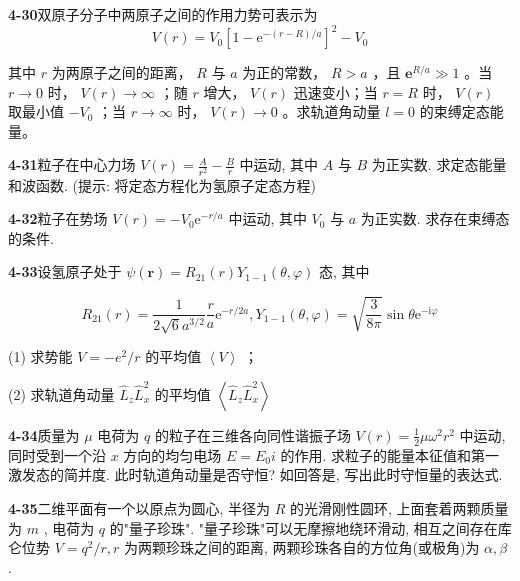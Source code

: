 \vfill

\newpage
\vfill

\noindent
\textbf{4-30}\quad 双原子分子中两原子之间的作用力势可表示为
$$
V (r) = V _ {0} \left[ 1 - \mathrm{e} ^ {- (r - R) / a} \right] ^ {2} - V _ {0}
$$

其中 $r$ 为两原子之间的距离， $R$ 与 $a$ 为正的常数， $R > a$ ，且 $\mathbf{e}^{R / a} \gg 1$ 。当 $r \to 0$ 时， $V(r) \to \infty$ ；随 $r$ 增大， $V(r)$ 迅速变小；当 $r = R$ 时， $V(r)$ 取最小值 $-V_0$ ；当 $r \to \infty$ 时， $V(r) \to 0$ 。求轨道角动量 $l = 0$ 的束缚定态能量。

\vfill

\newpage
\vfill

\noindent
\textbf{4-31}\quad 粒子在中心力场 $V(r) = \frac{A}{r^2} -\frac{B}{r}$ 中运动, 其中 $A$ 与 $B$ 为正实数. 求定态能量和波函数. (提示: 将定态方程化为氢原子定态方程)

\vfill

\newpage
\vfill

\noindent
\textbf{4-32}\quad 粒子在势场 $V(r) = -V_0\mathrm{e}^{-r / a}$ 中运动, 其中 $V_{0}$ 与 $a$ 为正实数. 求存在束缚态的条件.

\vfill

\newpage
\vfill

\noindent
\textbf{4-33}\quad 设氢原子处于 $\psi(\boldsymbol{r}) = R_{21}(r) Y_{1-1}(\theta, \varphi)$ 态, 其中

$$
R _ {2 1} (r) = \frac {1}{2 \sqrt {6} a ^ {3 / 2}} \frac {r}{a} \mathrm{e} ^ {- r / 2 a}, Y _ {1 - 1} (\theta , \varphi) = \sqrt {\frac {3}{8 \pi}} \sin \theta \mathrm{e} ^ {- \mathrm{i} \varphi}
$$

(1) 求势能 $V = -e^{2} / r$ 的平均值 $\left\langle V\right\rangle$ ；

(2) 求轨道角动量 $\hat{L}_z \hat{L}_x^2$ 的平均值 $\left\langle \hat{L}_z \hat{L}_x^2 \right\rangle$

\vfill

\newpage
\vfill

\noindent
\textbf{4-34}\quad 质量为 $\mu$ 电荷为 $q$ 的粒子在三维各向同性谐振子场 $V(r) = \frac{1}{2}\mu \omega^2 r^2$ 中运动, 同时受到一个沿 $x$ 方向的均匀电场 $E = E_0i$ 的作用. 求粒子的能量本征值和第一激发态的简并度. 此时轨道角动量是否守恒? 如回答是, 写出此时守恒量的表达式.

\vfill

\newpage
\vfill

\noindent
\textbf{4-35}\quad 二维平面有一个以原点为圆心, 半径为 $R$ 的光滑刚性圆环, 上面套着两颗质量为 $m$ , 电荷为 $q$ 的"量子珍珠". "量子珍珠"可以无摩擦地绕环滑动, 相互之间存在库仑位势 $V = q^2 / r, r$ 为两颗珍珠之间的距离, 两颗珍珠各自的方位角(或极角)为 $\alpha, \beta$ . 

